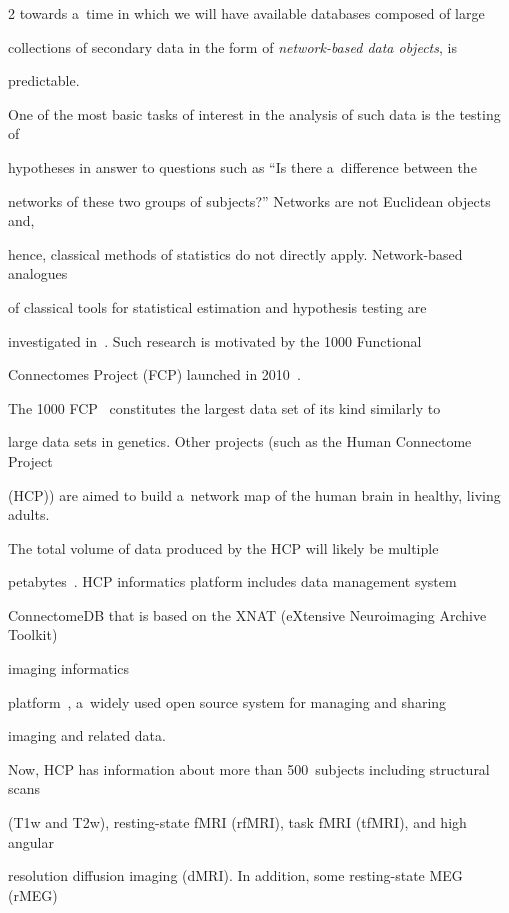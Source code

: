 \begin{multicols}{2}
towards a~time in which we will have available databases composed of large


collections of secondary data in the form of \textit{network-based data objects}, is


predictable.





  One of the most basic tasks of interest in the analysis of such data is the testing of


hypotheses in answer to questions such as ``Is there a~difference between the


networks of these two groups of subjects?'' Networks are not Euclidean objects and,


hence, classical methods of statistics do not directly apply. Network-based analogues


of classical tools for statistical estimation and hypothesis testing are


investigated in~\cite{64-kl, 65-kl}. Such research is motivated by the 1000 Functional


Connectomes Project (FCP) launched in 2010~\cite{62-kl}.


  The 1000 FCP~\cite{66-kl} constitutes the largest data set of its kind similarly to


large data sets in genetics. Other projects (such as the Human Connectome Project


(HCP)) are aimed to build a~network map of the human brain in healthy, living adults.


The total volume of data produced by the HCP will likely be multiple


petabytes~\cite{67-kl}. HCP informatics platform includes data management system


ConnectomeDB that is based on the XNAT (eXtensive Neuroimaging Archive Toolkit)


imaging informatics


  platform~\cite{68-kl}, a~widely used open source system for managing and sharing


imaging and related data.





  Now, HCP has information about more than 500~subjects including structural scans


(T1w and T2w), resting-state fMRI (rfMRI), task fMRI (tfMRI), and high angular


resolution diffusion imaging (dMRI). In addition, some resting-state MEG (rMEG)



\end{multicols}
